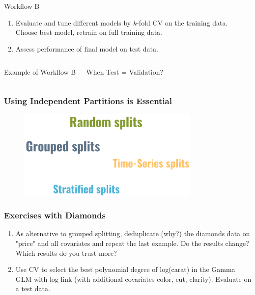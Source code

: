\documentclass[
    utf8,
    aspectratio=169
]{beamer}  %
\begin{document}
\begin{frame}
\begin{columns}[onlytextwidth]
\begin{block}{Workflow B}
\begin{footnotesize}
\begin{enumerate}
					e.g., by ratios 90\%/10\%.
					\item Evaluate and tune different models by $k$-fold CV on the training data. Choose best model, retrain on full training data.
					\item Assess performance of final model on test data.
				\end{enumerate}
			\end{footnotesize}
		\end{block}
	\end{columns}

	\begin{columns}
		\begin{exampleblock}{Example of Workflow B}
		\end{exampleblock}
	
		\alert{When Test = Validation?}
	\end{columns}
\end{frame}

\begin{frame}
	\frametitle{Using Independent Partitions is Essential}
	\begin{figure}
		\includegraphics[width=0.8\textwidth]{pics/validation_independent.png}
	\end{figure}
\end{frame}

\begin{frame}
	\frametitle{Exercises with Diamonds}
	\begin{enumerate}
		\item As alternative to grouped splitting, deduplicate (why?) the diamonds data on "price" and all covariates and repeat the last example. Do the results change? Which results do you trust more?
		
		\vfill
		
		\item Use CV to select the best polynomial degree of log(carat) in the Gamma GLM with log-link (with additional covariates color, cut, clarity). Evaluate on a test data.
	\end{enumerate}
\end{frame}
\end{document}
